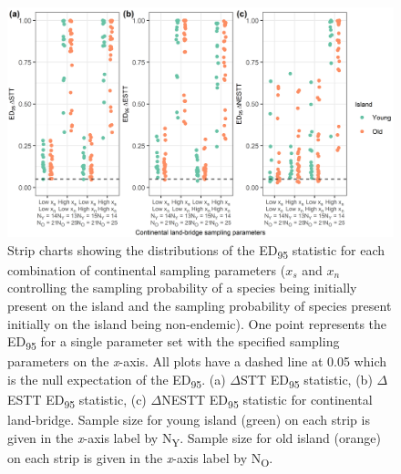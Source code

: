 \begin{figure}
    \centering
    \includegraphics{nonoceanic_land_bridge_sampling_parameters.png}
    \caption{Strip charts showing the distributions of the ED\textsubscript{95} statistic for each combination of continental sampling parameters ($x_s$ and $x_n$ controlling the sampling probability of a species being initially present on the island and the sampling probability of species present initially on the island being non-endemic). One point represents the ED\textsubscript{95} for a single parameter set with the specified sampling parameters on the \textit{x}-axis. All plots have a dashed line at 0.05 which is the null expectation of the ED\textsubscript{95}. (a) $\Delta$STT ED\textsubscript{95} statistic, (b) $\Delta$ESTT ED\textsubscript{95} statistic, (c) $\Delta$NESTT ED\textsubscript{95} statistic for continental land-bridge. Sample size for young island (green) on each strip is given in the \textit{x}-axis label by N\textsubscript{Y}. Sample size for old island (orange) on each strip is given in the \textit{x}-axis label by N\textsubscript{O}.}
    \label{fig:nonoceanic_land_bridge_sampling_parameters}
\end{figure}


